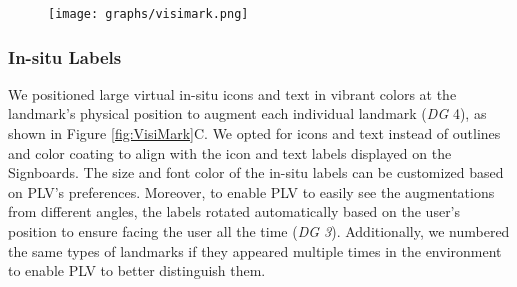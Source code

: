 \begin{figure*}[t]
    \centering
    \begin{subfigure}{0.99\textwidth}
        \centering
        \texttt{[image: graphs/visimark.png]}
    \end{subfigure}
    \caption{VisiMark design features: (A) Signboards that provide an overview of hallway structures and upcoming landmarks; (B) Color-coded hallways and their virtual representations (i.e., arrows) on the Signboard; (C) In-situ Labels with icons and texts for individual landmarks. (D) The dead-end marker at the tip of an arrow to represent the left hallway is a dead end.}
    
    \label{fig:VisiMark}
\end{figure*}

\subsubsection{In-situ Labels}
We positioned large virtual in-situ icons and text in vibrant colors at the landmark's physical position to augment each individual landmark (\textit{DG} 4), as shown in Figure \ref{fig:VisiMark}C. We opted for icons and text instead of outlines and color coating to align with the icon and text labels displayed on the Signboards. The size and font color of the in-situ labels can be customized based on PLV's preferences. Moreover, to enable PLV to easily see the augmentations from different angles, the labels rotated automatically based on the user's position to ensure facing the user all the time (\textit{DG 3}). %
Additionally, we numbered the same types of landmarks if they appeared multiple times in the environment to enable PLV to better distinguish them.


